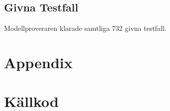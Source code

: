 \documentclass[]{article}
\begin{document}
\subsection{Givna Testfall}
Modellproveraren klarade samtliga 732 givna testfall.

\clearpage
\section*{Appendix}
\appendix

\section{Källkod}

%
\end{document}
